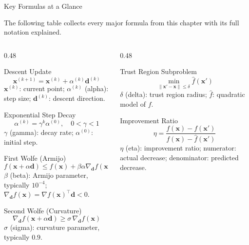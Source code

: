 \documentclass[aspectratio=169,10pt]{beamer}
\newcommand{\bx}{\mathbf{x}}
\newcommand{\bd}{\mathbf{d}}
\newcommand{\grad}{\nabla}
\begin{document}
\begin{frame}[allowframebreaks]{Key Formulas at a Glance}

  The following table collects every major formula from this chapter
  with its full notation explained.

  \begin{columns}[T]
    \begin{column}{0.48\textwidth}
      \begin{block}{Descent Update}
        \[
          \bx^{(k+1)} = \bx^{(k)} + \alpha^{(k)}\bd^{(k)}
        \]
        $\bx^{(k)}$: current point;
        $\alpha^{(k)}$ (alpha): step size;
        $\bd^{(k)}$: descent direction.
      \end{block}

      \begin{block}{Exponential Step Decay}
        \[
          \alpha^{(k)} = \gamma^k\alpha^{(0)},\quad 0<\gamma<1
        \]
        $\gamma$ (gamma): decay rate; $\alpha^{(0)}$: initial step.
      \end{block}

      \begin{block}{First Wolfe (Armijo)}
        \[
          f(\bx+\alpha\bd)\le f(\bx)+\beta\alpha\grad_{\bd}f(\bx)
        \]
        $\beta$ (beta): Armijo parameter, typically $10^{-4}$;
        $\grad_{\bd}f(\bx) = \grad f(\bx)^{\top}\bd < 0$.
      \end{block}

      \begin{block}{Second Wolfe (Curvature)}
        \[
          \grad_{\bd}f(\bx+\alpha\bd)\ge\sigma\,\grad_{\bd}f(\bx)
        \]
        $\sigma$ (sigma): curvature parameter, typically $0.9$.
      \end{block}
    \end{column}
    \begin{column}{0.48\textwidth}
      \begin{block}{Trust Region Subproblem}
        \[
          \min_{\|\bx'-\bx\|\le\delta}\hat{f}(\bx')
        \]
        $\delta$ (delta): trust region radius;
        $\hat{f}$: quadratic model of $f$.
      \end{block}

      \begin{block}{Improvement Ratio}
        \[
          \eta = \frac{f(\bx)-f(\bx')}{f(\bx)-\hat{f}(\bx')}
        \]
        $\eta$ (eta): improvement ratio;
        numerator: actual decrease; denominator: predicted decrease.
      \end{block}


\end{column}
\end{columns}
\end{frame}
\end{document}
